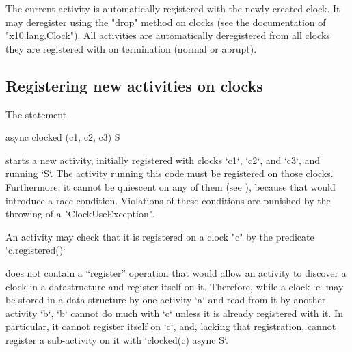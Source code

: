 The current activity is automatically registered with the newly
created clock.  It may deregister using the \xcd"drop" method on
clocks (see the documentation of \xcd"x10.lang.Clock"). All activities
are automatically deregistered from all clocks they are registered
with on termination (normal or abrupt).

\subsection{Registering new activities on clocks}
\label{sec:clock:register}

The statement 

\begin{xten}
  async clocked (c1, c2, c3) S
\end{xten}
starts a new activity, initially registered with
clocks \xcd`c1`, \xcd`c2`, and \xcd`c3`, and  running \xcd`S`. The activity running this code must
be registered on those clocks. Furthermore, it cannot be quiescent on any of
them (see ), because that would introduce a race condition.
Violations of these conditions are punished by the throwing of a
\xcd"ClockUseException". 


An activity may check that it is registered on a clock \xcd"c" by
the predicate \xcd`c.registered()`


\begin{note}
\Xten{} does not contain a ``register'' operation that would allow an activity
to discover a clock in a datastructure and register itself on it. Therefore,
while a clock \xcd`c` may be stored in a data structure by one activity
\xcd`a` and read from it by another activity \xcd`b`, \xcd`b` cannot do much
with \xcd`c` unless it is already registered with it.  In particular, it
cannot register itself on \xcd`c`, and, lacking that registration, cannot
register a sub-activity on it with \xcd`clocked(c) async S`.
\end{note}


